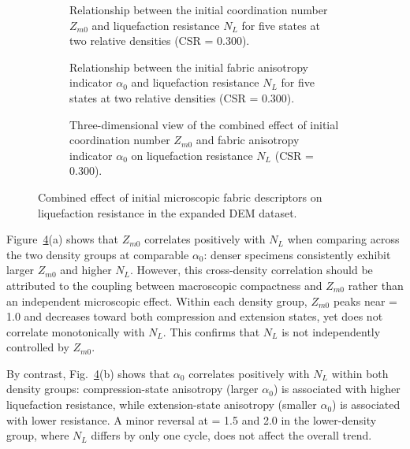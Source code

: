 \begin{figure}[t]
  \centering
  \begin{subfigure}[t]{0.455\textwidth}
    \centering
    \caption{Relationship between the initial coordination number $Z_{m0}$ and liquefaction resistance $N_L$ for five \Kzero{} states at two relative densities (CSR = 0.300).}
    \label{fig:fabric_liq_pair_zm}
  \end{subfigure}
  \hfill
  \begin{subfigure}[t]{0.455\textwidth}
    \centering
    \caption{Relationship between the initial fabric anisotropy indicator $\alpha_0$ and liquefaction resistance $N_L$ for five \Kzero{} states at two relative densities (CSR = 0.300).}
    \label{fig:fabric_liq_pair_alpha}
  \end{subfigure}

  \vspace{0.5em}

  \begin{subfigure}[t]{0.455\textwidth}
    \centering
    \caption{Three-dimensional view of the combined effect of initial coordination number $Z_{m0}$ and fabric anisotropy indicator $\alpha_0$ on liquefaction resistance $N_L$ (CSR = 0.300).}
    \label{fig:fabric_liq_pair_3d}
  \end{subfigure}
  \caption{Combined effect of initial microscopic fabric descriptors on liquefaction resistance in the expanded DEM dataset.}
  \label{fig:fabric_liq_pair}
\end{figure}

Figure~\ref{fig:fabric_liq_pair}(a) shows that $Z_{m0}$ correlates positively with $N_L$ when comparing across the two density groups at comparable $\alpha_0$: denser specimens consistently exhibit larger $Z_{m0}$ and higher $N_L$. However, this cross-density correlation should be attributed to the coupling between macroscopic compactness and $Z_{m0}$ rather than an independent microscopic effect. Within each density group, $Z_{m0}$ peaks near \Kzero{} = 1.0 and decreases toward both compression and extension states, yet does not correlate monotonically with $N_L$. This confirms that $N_L$ is not independently controlled by $Z_{m0}$.

By contrast, Fig.~\ref{fig:fabric_liq_pair}(b) shows that $\alpha_0$ correlates positively with $N_L$ within both density groups: compression-state anisotropy (larger $\alpha_0$) is associated with higher liquefaction resistance, while extension-state anisotropy (smaller $\alpha_0$) is associated with lower resistance. A minor reversal at \Kzero{} = 1.5 and 2.0 in the lower-density group, where $N_L$ differs by only one cycle, does not affect the overall trend.

